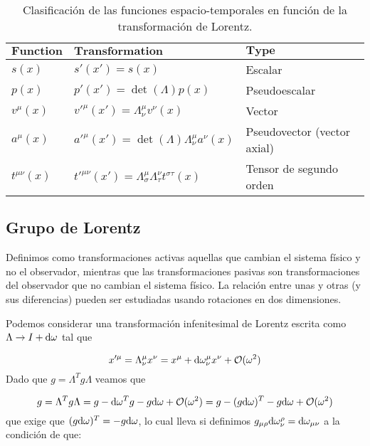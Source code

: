 \begin{table}[h!]
	\centering
	\begin{tabular}{@{}lll@{}}
		
		\(\textbf{Function}\)    & \(\textbf{Transformation}\)              & \(\textbf{Type}\)          \\ \hline
		\(s(x)\)    & \(s'(x') = s(x)\)                           & Escalar                     \\
		\(p(x)\)    & \(p'(x') = \det(\Lambda)p(x)\)              & Pseudoescalar               \\
		\(v^\mu(x)\) & \(v'^\mu(x') = \Lambda^\mu_\nu v^\nu(x)\)   & Vector                     \\
		\(a^\mu(x)\) & \(a'^\mu(x') = \det(\Lambda)\Lambda^\mu_\nu a^\nu(x)\) & Pseudovector (vector axial) \\
		\(t^{\mu\nu}(x)\) & \(t'^{\mu\nu}(x') = \Lambda^\mu_\sigma \Lambda^\nu_\tau t^{\sigma\tau}(x)\) & Tensor de segundo orden         \\ 
	\end{tabular}
	\caption{Clasificación de las funciones espacio-temporales en función de la transformación de Lorentz.}
\end{table}



\subsection{Grupo de Lorentz}

Definimos como transformaciones activas aquellas que cambian el sistema físico y no el observador, mientras que las transformaciones pasivas son transformaciones del observador que no cambian el sistema físico. La relación entre unas y otras (y sus diferencias) pueden ser estudiadas usando rotaciones en dos dimensiones.

Podemos considerar una transformación infenitesimal de Lorentz escrita como $\Lambda \rightarrow I + \mathrm{d} \omega$ tal que

\begin{equation}
	x'^\mu=\Lambda^\mu_\nu x^\nu =x^\mu+\mathrm{d} \omega^\mu_\nu x^\nu + \mathcal{O} (\omega^2)
\end{equation}
Dado que $g=\Lambda^T g \Lambda$ veamos que 

\begin{equation}
	g=\Lambda^T g \Lambda = g - \mathrm{d} \omega^T g - g\mathrm{d} \omega + \mathcal{O}(\omega^2) = g - (g\mathrm{d} \omega)^T - g\mathrm{d} \omega + \mathcal{O} (\omega^2)
\end{equation}
que exige que $(g\mathrm{d} \omega)^T = -g\mathrm{d} \omega$, lo cual lleva si definimos $g_{\mu \rho} \mathrm{d} \omega^{\rho}_\nu = \mathrm{d} \omega_{\mu \nu}$ a la condición de que:

